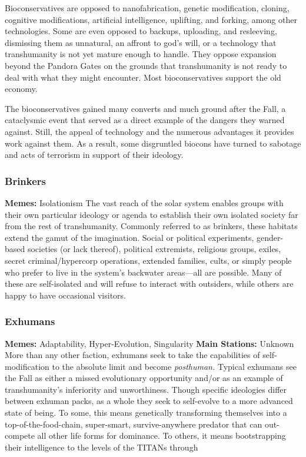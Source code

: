 Bioconservatives are opposed to nanofabrication, 
genetic modification, cloning, cognitive modifications, 
artificial intelligence, uplifting, and forking, among 
other technologies. Some are even opposed to backups, uploading, and resleeving, dismissing them as unnatural, an affront to god's will, or a technology that 
transhumanity is not yet mature enough to handle. 
They oppose expansion beyond the Pandora Gates on 
the grounds that transhumanity is not ready to deal 
with what they might encounter. Most bioconservatives support the old economy.

The bioconservatives gained many converts and 
much ground after the Fall, a cataclysmic event 
that served as a direct example of the dangers they 
warned against. Still, the appeal of technology and 
the numerous advantages it provides work against 
them. As a result, some disgruntled biocons have 
turned to sabotage and acts of terrorism in support 
of their ideology.

\subsubsection{Brinkers}

\textbf{Memes:} Isolationism
The vast reach of the solar system enables groups 
with their own particular ideology or agenda to establish their own isolated society far from the rest 
of transhumanity. Commonly referred to as brinkers, 
these habitats extend the gamut of the imagination. 
Social or political experiments, gender-based societies (or lack thereof), political extremists, religious 
groups, exiles, secret criminal/hypercorp operations, 
extended families, cults, or simply people who prefer 
to live in the system's backwater areas—all are possible. Many of these are self-isolated and will refuse 
to interact with outsiders, while others are happy to 
have occasional visitors.

\subsubsection{Exhumans}

\textbf{Memes:} Adaptability, Hyper-Evolution, Singularity
\textbf{Main Stations:} Unknown
More than any other faction, exhumans seek to take 
the capabilities of self-modification to the absolute 
limit and become \textit{posthuman.} Typical exhumans see 
the Fall as either a missed evolutionary opportunity 
and/or as an example of transhumanity's inferiority 
and unworthiness. Though specific ideologies differ 
between exhuman packs, as a whole they seek to self-evolve to a more advanced state of being. To some, 
this means genetically transforming themselves into a 
top-of-the-food-chain, super-smart, survive-anywhere 
predator that can out-compete all other life forms 
for dominance. To others, it means bootstrapping 
their intelligence to the levels of the TITANs through 

